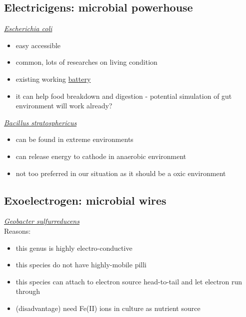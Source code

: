 \documentclass[a4paper,11pt]{article}
\begin{document}
    \subsection{Electricigens: microbial powerhouse}
    \href{https://microbewiki.kenyon.edu/index.php/Escherichia_coli}{\textit{Escherichia coli}}
    \begin{itemize}
        \item easy accessible
        \item common, lots of researches on living condition
        \item existing working \href{https://www.greenoptimistic.com/bio-battery-e-coli-20130718/}{battery}
        \item it can help food breakdown and digestion - potential simulation of gut environment will work already?
    \end{itemize}
    \href{https://microbewiki.kenyon.edu/index.php/Bacillus_stratosphericus#Applications_to_Biotechnology}{\textit{Bacillus stratosphericus}}
    \begin{itemize}
        \item can be found in extreme environments
        \item can release energy to cathode in anaerobic environment
        \item not too preferred in our situation as it should be a oxic environment
    \end{itemize}
    
    \subsection{Exoelectrogen: microbial wires}
    \href{https://microbewiki.kenyon.edu/index.php/Geobacter}{\textit{Geobacter sulfurreducens}}\autocite{reguera2005extracellular}\\
    Reasons:
    \begin{itemize}
        \item this genus is highly electro-conductive
        \item this species do not have highly-mobile pilli
        \item this species can attach to electron source head-to-tail and let electron run through
        \item (disadvantage) need Fe(II) ions in culture as nutrient source
    \end{itemize}
    
\end{document}
